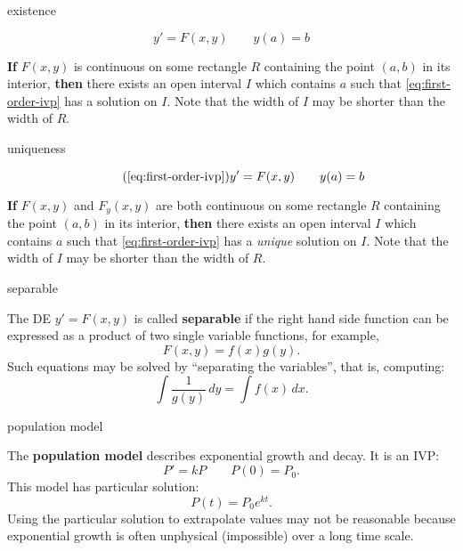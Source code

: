 \documentclass[avery5371,grid]{flashcards}
\newcommand{\defn}[1]{\textbf{#1}}
\begin{document}
\begin{flashcard}[Theorem]{existence}

  \begin{equation}
    \label{eq:first-order-ivp}
    y' = F(x,y) \qquad y(a) = b
  \end{equation}

  \textbf{If} $F(x,y)$ is continuous on some rectangle $R$ containing
  the point $(a,b)$ in its interior, \textbf{then} there exists an
  open interval $I$ which contains $a$ such that
  \eqref{eq:first-order-ivp} has a solution on $I$. Note that the
  width of $I$ may be shorter than the width of $R$.

\end{flashcard}

\begin{flashcard}[Theorem]{uniqueness}

  \begin{equation}
    \tag{\ref{eq:first-order-ivp}}
    y' = F(x,y) \qquad y(a) = b
  \end{equation}

  \textbf{If} $F(x,y)$ and $F_y(x,y)$ are both continuous on some
  rectangle $R$ containing the point $(a,b)$ in its interior,
  \textbf{then} there exists an open interval $I$ which contains $a$
  such that \eqref{eq:first-order-ivp} has a \emph{unique} solution on
  $I$. Note that the width of $I$ may be shorter than the width of
  $R$.

\end{flashcard}

\begin{flashcard}[Definition]{separable}

  The DE $y' = F(x,y)$ is called \defn{separable} if the right hand
  side function can be expressed as a product of two single variable
  functions, for example,
  \[
    F(x,y) = f(x)g(y).
  \]
  Such equations may be solved by ``separating the variables'', that
  is, computing:
  \[
    \int \frac{1}{g(y)} \, dy = \int f(x) \, dx.
  \]

\end{flashcard}

\begin{flashcard}[Definition]{population model}

  The \defn{population model} describes exponential growth and decay. It
  is an IVP:
  \[
    P' = kP \qquad P(0) = P_0.
  \]
  This model has particular solution:
  \[
    P(t) = P_0 e^{kt}.
  \]
  Using the particular solution to extrapolate values may not be
  reasonable because exponential growth is often unphysical
  (impossible) over a long time scale.

\end{flashcard}
\end{document}
